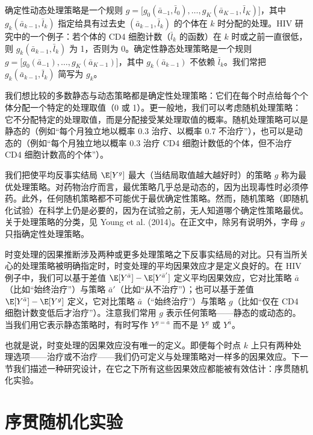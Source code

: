 \begin{finepoint}[确定性与随机处理策略]
确定性动态处理策略是一个规则 $g=\bigl[g_0(\bar{a}_{-1},\bar{l}_0),\ldots,g_K(\bar{a}_{K-1},\bar{l}_K)\bigr]$，其中 $g_k(\bar{a}_{k-1},\bar{l}_k)$ 指定给具有过去史 $(\bar{a}_{k-1},\bar{l}_k)$ 的个体在 $k$ 时分配的处理。HIV 研究中的一个例子：若个体的 CD4 细胞计数（$\bar{l}_k$ 的函数）在 $k$ 时或之前一直很低，则 $g_k(\bar{a}_{k-1},\bar{l}_k)$ 为 1，否则为 0。确定性静态处理策略是一个规则 $g=\bigl[g_0(\bar{a}_{-1}),\ldots,g_K(\bar{a}_{K-1})\bigr]$，其中 $g_k(\bar{a}_{k-1})$ 不依赖 $\bar{l}_k$。我们常把 $g_k(\bar{a}_{k-1},\bar{l}_k)$ 简写为 $g_k$。

我们想比较的多数静态与动态策略都是确定性处理策略：它们在每个时点给每个个体分配一个特定的处理取值（0 或 1）。更一般地，我们可以考虑随机处理策略：它不分配特定的处理取值，而是分配接受某处理取值的概率。随机处理策略可以是静态的（例如“每个月独立地以概率 0.3 治疗、以概率 0.7 不治疗”），也可以是动态的（例如“每个月独立地以概率 0.3 治疗 CD4 细胞计数低的个体，但不治疗 CD4 细胞计数高的个体”）。

我们把使平均反事实结局 $\E[Y^g]$ 最大（当结局取值越大越好时）的策略 $g$ 称为最优处理策略。对药物治疗而言，最优策略几乎总是动态的，因为出现毒性时必须停药。此外，任何随机策略都不可能优于最优确定性策略。然而，随机策略（即随机化试验）在科学上仍是必要的，因为在试验之前，无人知道哪个确定性策略最优。关于处理策略的分类，见 Young et al. (2014)。在正文中，除另有说明外，字母 $g$ 只指确定性处理策略。
\end{finepoint}

时变处理的因果推断涉及两种或更多处理策略之下反事实结局的对比。只有当所关心的处理策略被明确指定时，时变处理的平均因果效应才是定义良好的。在 HIV 例子中，我们可以基于差值 $\E[Y^{\bar{a}}]-\E[Y^{\bar{a}'}]$ 定义平均因果效应，它对比策略 $\bar{a}$（比如“始终治疗”）与策略 $\bar{a}'$（比如“从不治疗”）；也可以基于差值 $\E[Y^{\bar{a}}]-\E[Y^{g}]$ 定义，它对比策略 $\bar{a}$（“始终治疗”）与策略 $g$（比如“仅在 CD4 细胞计数变低后才治疗”）。注意我们常用 $g$ 表示任何策略——静态的或动态的。当我们用它表示静态策略时，有时写作 $Y^{g=\bar{a}}$ 而不是 $Y^g$ 或 $Y^{\bar{a}}$。

也就是说，时变处理的因果效应没有唯一的定义。即便每个时点 $k$ 上只有两种处理选项——治疗或不治疗——我们仍可定义与处理策略对一样多的因果效应。下一节我们描述一种研究设计，在它之下所有这些因果效应都能被有效估计：序贯随机化实验。

\section{序贯随机化实验}

